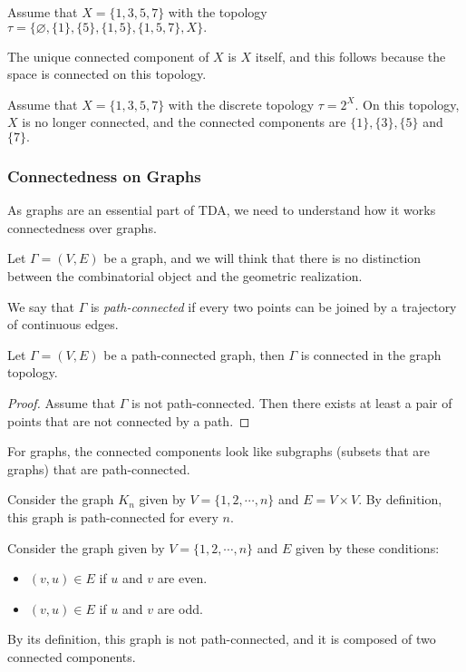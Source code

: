 \documentclass[
	fontsize=10pt, %
	twoside=false, %
	secnumdepth=1, %
]{kaobook}
\begin{document}
\begin{example}
Assume that $X=\{1,3,5,7\}$ with the topology $\tau=\{\varnothing,\{1\},\{5\},\{1,5\},\{1,5,7\},X\}.$ 

The unique connected component of $X$ is $X$ itself, and this follows because the space is connected on this topology.
\end{example}

\begin{example}
Assume that $X=\{1,3,5,7\}$ with the discrete topology $\tau=2^X.$ On this topology, $X$ is no longer connected, and the connected components are $\{1\},\{3\},\{5\}$ and $\{7\}.$
\end{example}

\subsubsection{Connectedness on Graphs}

As graphs are an essential part of TDA, we need to understand how it works connectedness over graphs. 

Let $\Gamma=(V, E)$ be a graph, and we will think that there is no distinction between the combinatorial object and the geometric realization. 

\begin{definition}
We say that $\Gamma$ is \emph{path-connected} if every two points can be joined by a trajectory of continuous edges. 
\end{definition}

\begin{proposition}	
Let $\Gamma=(V, E)$ be a path-connected graph, then $\Gamma$ is connected in the graph topology. 
\end{proposition}
\begin{proof}
Assume that $\Gamma$ is not path-connected. Then there exists at least a pair of points that are not connected by a path. 
\end{proof}

For graphs, the connected components look like subgraphs (subsets that are graphs) that are path-connected.

\begin{example}
Consider the graph $K_n$ given by $V=\{1,2,\cdots, n\}$ and $E=V\times V.$ By definition, this graph is path-connected for every $n.$ 
\end{example}

\begin{example}
Consider the graph given by $V=\{1,2,\cdots, n\}$ and $E$ given by these conditions:
\begin{itemize}
\item $(v,u)\in E$ if $u$ and $v$ are even.
\item $(v,u)\in E$ if $u$ and $v$ are odd.
\end{itemize}

By its definition, this graph is not path-connected, and it is composed of two connected components.
\end{example}
\end{document}
